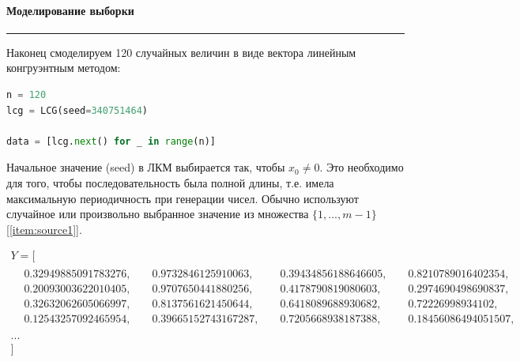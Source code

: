 \documentclass[a4paper, 14pt]{extarticle}
\begin{document}
\paragraph{Моделирование выборки}\vspace{-20pt}\rule{\linewidth}{0.1mm}

Наконец смоделируем 120 случайных величин в виде вектора линейным конгруэнтным методом:\\
\begin{center}
  \begin{lstlisting}[language=Python]
n = 120
lcg = LCG(seed=340751464)

data = [lcg.next() for _ in range(n)]
  \end{lstlisting}
\end{center}
\vspace{10pt}
Начальное значение (seed) в ЛКМ выбирается так, чтобы $x_0 \neq 0$. Это необходимо для того, чтобы 
последовательность была полной длины, т.е. имела максимальную периодичность 
при генерации чисел. Обычно используют случайное или произвольно выбранное 
значение из множества $\{1, ..., m - 1\}$ [\ref{item:source1}]. 

\noindent
\begin{adjustbox}{max width=1\textwidth}
  \parbox{\linewidth}{%
    \begin{gather*}
      Y = [ \\
      \begin{aligned}
        & 0.32949885091783276, & \hspace{3pt} & 0.9732846125910063,  & \hspace{3pt} & 0.39434856188646605, & \hspace{3pt} & 0.8210789016402354,  & \\
        & 0.20093003622010405, & \hspace{3pt} & 0.9707650441880256,  & \hspace{3pt} & 0.4178790819080603,  & \hspace{3pt} & 0.2974690498690837,  & \\
        & 0.32632062605066997, & \hspace{3pt} & 0.8137561621450644,  & \hspace{3pt} & 0.6418089688930682,  & \hspace{3pt} & 0.72226998934102,    & \\
        & 0.12543257092465954, & \hspace{3pt} & 0.39665152743167287, & \hspace{3pt} & 0.7205668938187388,  & \hspace{3pt} & 0.18456086494051507, & \\ 
      \end{aligned} \\
      ...\\
      ]
    \end{gather*}
  }
\end{adjustbox}
\end{document}
